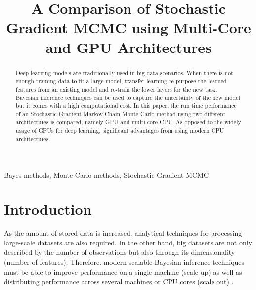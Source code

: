 \documentclass[conference]{IEEEtran}
\begin{document}
	
	\title{A Comparison of Stochastic Gradient MCMC using Multi-Core and GPU Architectures}
	
	\author{
	\and
	\and
	}
	
	\IEEEoverridecommandlockouts
	\maketitle
	\IEEEpubidadjcol
	\begin{abstract}
		Deep learning models are traditionally used in big data scenarios. When there is not enough training data to fit a large model, transfer learning re-purpose the learned features from an existing model and re-train the lower layers for the new task. Bayesian inference techniques can be used to capture the uncertainty of the new model but it comes with a high computational cost. In this paper, the run time performance of an Stochastic Gradient Markov Chain Monte Carlo method using two different architectures is compared, namely GPU and multi-core CPU. As opposed to the widely usage of GPUs for deep learning, significant advantages from using modern CPU architectures.
	\end{abstract}
	
	\begin{IEEEkeywords}
		Bayes methods, Monte Carlo methods, Stochastic Gradient MCMC
	\end{IEEEkeywords}

\section{Introduction}
As the amount of stored data is increased. analytical techniques for processing large-scale datasets are also required. In the other hand, big datasets are not only described by the number of observations but also through its dimensionality (number of features). Therefore. modern scalable Bayesian inference techniques must be able to improve performance on a single machine (scale up) as well as distributing performance across several machines or CPU cores (scale out) \cite{angelino2016patterns}.
\end{document}
